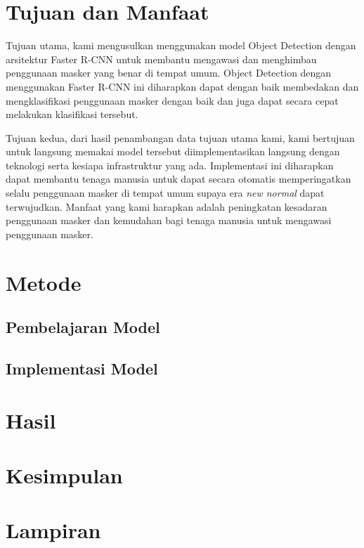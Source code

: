 \documentclass{article}
\begin{document}
  \section{Tujuan dan Manfaat}
  		\par Tujuan utama, kami mengusulkan menggunakan model Object Detection dengan arsitektur Faster R-CNN untuk membantu mengawasi dan menghimbau penggunaan masker yang benar di tempat umum. Object Detection dengan menggunakan Faster R-CNN ini diharapkan dapat dengan baik membedakan dan mengklasifikasi penggunaan masker dengan baik dan juga dapat secara cepat melakukan klasifikasi tersebut.
  		
  		\par Tujuan kedua, dari hasil penambangan data tujuan utama kami, kami bertujuan untuk langsung memakai model tersebut diimplementasikan langsung dengan teknologi serta kesiapa infrastruktur yang ada. Implementasi ini diharapkan dapat membantu tenaga manusia untuk dapat secara otomatis memperingatkan selalu penggunaan masker di tempat umum supaya era \textit{new normal} dapat terwujudkan. Manfaat yang kami harapkan adalah peningkatan kesadaran penggunaan masker dan kemudahan bagi tenaga manusia untuk mengawasi penggunaan masker.
  \section{Metode}
  	\subsection{Pembelajaran Model}
  	\subsection{Implementasi Model}
  \section{Hasil}
  \section{Kesimpulan}
  \section{Lampiran}
  \newpage
  \printbibliography[title={Referensi}]
\end{document}
